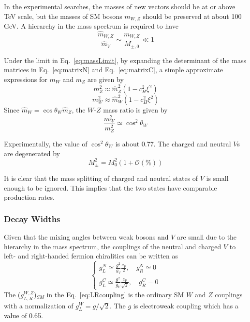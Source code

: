 In the experimental searches, the masses of new vectors should be at or above TeV scale, but the masses of SM bosons $m_{W,Z}$ should be preserved at about 100 GeV. A hierarchy in the mass spectrum is required to have
\begin{equation} \label{eq:massLimit}
  \frac{\hat{m}_{W,Z}}{\hat{m}_V} \sim \frac{m_{W,Z}}{M_{\pm,0}} \ll 1
\end{equation}

Under the limit in Eq.~\ref{eq:massLimit}, by expanding the determinant of the mass matrices in Eq.~\ref{eq:matrixN} and Eq.~\ref{eq:matrixC}, a simple approximate expressions for $m_W$ and $m_Z$ are given by
\[m_Z^2 \approx \hat{m}_Z^2(1-c_H^2\xi^2)\]
\[m_W^2 \approx \hat{m}_W^2(1-c_H^2\xi^2)\]
Since $\hat{m}_W = \cos\theta_W\hat{m}_Z$, the $W$-$Z$ mass ratio is given by 
\begin{equation} \label{eq:weakMass}
  \frac{m_W^2}{m_Z^2} \simeq \cos^2\theta_W
\end{equation}

Experimentally, the value of $\cos^2\theta_W$ is about 0.77. The charged and neutral $V$s are degenerated by
\begin{equation} \label{eq:hvtMass}
  M_\pm^2 = M_0^2 (1+\mathcal{O}(\%))
\end{equation}

It is clear that the mass splitting of charged and neutral states of $V$ is small enough to be ignored. This implies that the two states have comparable production rates.

\subsubsection*{Decay Widths}

Given that the mixing angles between weak bosons and $V$ are small due to the hierarchy in the mass spectrum, the couplings of the neutral and charged $V$ to left- and right-handed fermion chiralities can be written as
\begin{equation} \label{eq:LRcoupling}
  \begin{cases}
    g_L^N \simeq\frac{g^2}{g_V}\frac{c_F}{2}, \quad g_R^N \simeq 0 \\
    g_L^C \simeq\frac{g^2}{g_V}\frac{c_F}{\sqrt{2}}, \quad g_R^C = 0
  \end{cases}
\end{equation}
The ($g_{L,R}^{W,Z}$)$_{SM}$ in the Eq.~\ref{eq:LRcoupling} is the ordinary SM $W$ and $Z$ couplings with a normalization of $g_L^W = g/\sqrt{2}$. The $g$ is electroweak coupling which has a value of 0.65.


